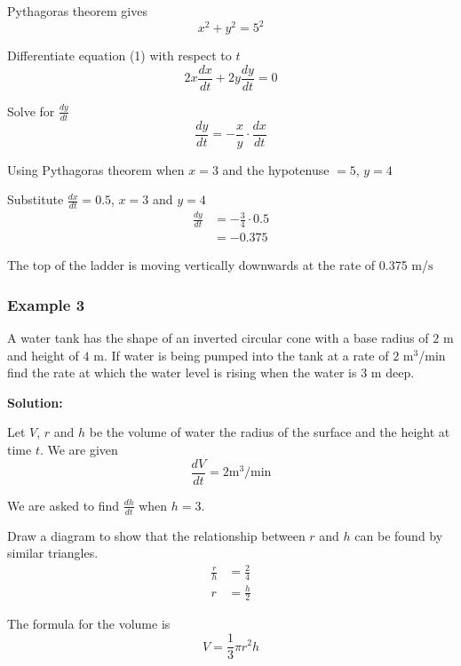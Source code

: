 Pythagoras theorem gives
\begin{equation}x^{2} +y^{2} =5^{2}\tag{1}
\end{equation}

Differentiate equation (1) with respect to $t$
\begin{equation*}2 x \frac{d x}{d t} +2 y \frac{d y}{d t} =0
\end{equation*}

Solve for $\frac{d y}{d t}$
\begin{equation*}\frac{d y}{d t} = -\frac{x}{y} \cdot \frac{d x}{d t}
\end{equation*}

Using Pythagoras theorem when $x =3$ and the hypotenuse $ =5$, $y =4$ 

Substitute $\frac{d x}{d t} =0.5$, $x =3$ and $y =4$
\begin{align*}\frac{d y}{d t} &  =  -\frac{3}{4} \cdot 0.5 \\
 &  =  -0.375\end{align*}

The top of the ladder is moving vertically downwards at the rate of 0.375 $\mbox{m}$/$\mbox{s}$ 

\subsubsection{Example 3}
A water tank has the shape of an inverted circular cone with a base radius of $2$ $\mbox{m}$ and height of $4$ $\mbox{m}$. If water is being pumped into
the tank at a rate of $2$ $\mathrm{m}^{3}$/$\mbox{min}$ find the rate at which the water level is rising when the water is $3$ $\mbox{m}$ deep. 

\textbf{Solution:} 

Let
$V$, $r$ and $h$ be the volume of water the radius of the surface and the height at time $t$. We are given
\begin{equation*}\frac{d V}{d t} =2\text{}\mathrm{m}^{3}/\mbox{min}
\end{equation*}

We are asked to find $\frac{d h}{d t}$ when $h =3$. 

Draw a diagram to show that the relationship between $r$ and $h$ can be found by similar triangles.
\begin{align}\frac{r}{h} &  = \frac{2}{4} \nonumber  \\
r &  = \frac{h}{2} \tag{1}\end{align}

The formula for the volume is
\begin{equation}V =\frac{1}{3} \pi  r^{2} h\tag{2}
\end{equation}

